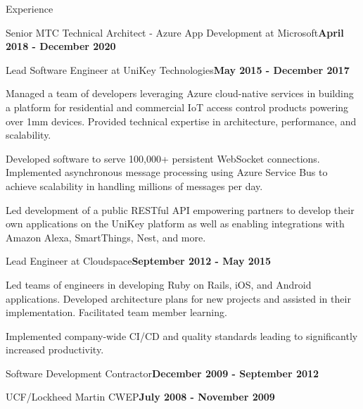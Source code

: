 \documentclass{resume} %
\begin{document}
\begin{rSection}{Experience}
\begin{rSubsection}{Senior MTC Technical Architect - Azure App Development at Microsoft}{\bf April 2018 - December 2020}{}{}
\end{rSubsection}


\begin{rSubsection}{Lead Software Engineer at UniKey Technologies}{\bf May 2015 - December 2017}{}{}

\item Managed a team of developers leveraging Azure cloud-native services in building a platform for residential and commercial IoT access control products powering over 1mm devices.  Provided technical expertise in architecture, performance, and scalability.
\item Developed software to serve 100,000+ persistent WebSocket connections. Implemented asynchronous message processing using Azure Service Bus to achieve scalability in handling millions of messages per day.
\item Led development of a public RESTful API empowering partners to develop their own applications on the UniKey platform as well as enabling integrations with Amazon Alexa, SmartThings, Nest, and more.

\end{rSubsection}


\begin{rSubsection}{Lead Engineer at Cloudspace}{\bf September 2012 - May 2015}{}{}

\item Led teams of engineers in developing Ruby on Rails, iOS, and Android applications.  Developed architecture plans for new projects and assisted in their implementation. Facilitated team member learning.
\item Implemented company-wide CI/CD and quality standards leading to significantly increased productivity.
    
\end{rSubsection}


\begin{rSubsectionTitleOnly}{Software Development Contractor}{\bf December 2009 - September 2012}{}{}
\end{rSubsectionTitleOnly}


\begin{rSubsectionTitleOnly}{UCF/Lockheed Martin CWEP}{\bf July 2008 - November 2009}{}{}
\end{rSubsectionTitleOnly}


\end{rSection}
\end{document}

